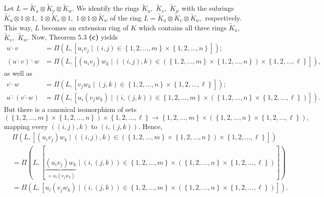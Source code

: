 \documentclass[numbers=enddot,12pt,final,onecolumn,notitlepage]{scrartcl}%
\begin{document}
Let $L=\widetilde{K}_{u}\otimes\widetilde{K}_{v}\otimes\widetilde{K}_{w}$. We
identify the rings $\widetilde{K}_{u},$ $\widetilde{K}_{v},$ $\widetilde{K}%
_{w}$ with the subrings $\widetilde{K}_{u}\otimes1\otimes1,$ $1\otimes
\widetilde{K}_{v}\otimes1,$ $1\otimes1\otimes\widetilde{K}_{w}$ of the ring
$L=\widetilde{K}_{u}\otimes\widetilde{K}_{v}\otimes\widetilde{K}_{w},$
respectively. This way, $L$ becomes an extension ring of $K$ which contains
all three rings $\widetilde{K}_{u},$ $\widetilde{K}_{v},$ $\widetilde{K}_{w}.$
Now, Theorem 5.3 \textbf{(c)} yields%
\begin{align*}
u\widehat{\cdot}v  &  =\Pi\left(  L,\left[  u_{i}v_{j}\mid\left(  i,j\right)
\in\left\{  1,2,...,m\right\}  \times\left\{  1,2,...,n\right\}  \right]
\right)  ;\\
\left(  u\widehat{\cdot}v\right)  \widehat{\cdot}w  &  =\Pi\left(  L,\left[
\left(  u_{i}v_{j}\right)  w_{k}\mid\left(  \left(  i,j\right)  ,k\right)
\in\left(  \left\{  1,2,...,m\right\}  \times\left\{  1,2,...,n\right\}
\right)  \times\left\{  1,2,...,\ell\right\}  \right]  \right)  ,
\end{align*}
as well as%
\begin{align*}
v\widehat{\cdot}w  &  =\Pi\left(  L,\left[  v_{j}w_{k}\mid\left(  j,k\right)
\in\left\{  1,2,...,n\right\}  \times\left\{  1,2,...,\ell\right\}  \right]
\right)  ;\\
u\widehat{\cdot}\left(  v\widehat{\cdot}w\right)   &  =\Pi\left(  L,\left[
u_{i}\left(  v_{j}w_{k}\right)  \mid\left(  i,\left(  j,k\right)  \right)
\in\left\{  1,2,...,m\right\}  \times\left(  \left\{  1,2,...,n\right\}
\times\left\{  1,2,...,\ell\right\}  \right)  \right]  \right)  .
\end{align*}
But there is a canonical isomorphism of sets%
\[
\left(  \left\{  1,2,...,m\right\}  \times\left\{  1,2,...,n\right\}  \right)
\times\left\{  1,2,...,\ell\right\}  \rightarrow\left\{  1,2,...,m\right\}
\times\left(  \left\{  1,2,...,n\right\}  \times\left\{  1,2,...,\ell\right\}
\right)  ,
\]
mapping every $\left(  \left(  i,j\right)  ,k\right)  $ to $\left(  i,\left(
j,k\right)  \right)  $. Hence,%
\begin{align*}
&  \Pi\left(  L,\left[  \left(  u_{i}v_{j}\right)  w_{k}\mid\left(  \left(
i,j\right)  ,k\right)  \in\left(  \left\{  1,2,...,m\right\}  \times\left\{
1,2,...,n\right\}  \right)  \times\left\{  1,2,...,\ell\right\}  \right]
\right) \\
&  =\Pi\left(  L,\left[  \underbrace{\left(  u_{i}v_{j}\right)  w_{k}}%
_{=u_{i}\left(  v_{j}w_{k}\right)  }\mid\left(  i,\left(  j,k\right)  \right)
\in\left\{  1,2,...,m\right\}  \times\left(  \left\{  1,2,...,n\right\}
\times\left\{  1,2,...,\ell\right\}  \right)  \right]  \right) \\
&  =\Pi\left(  L,\left[  u_{i}\left(  v_{j}w_{k}\right)  \mid\left(  i,\left(
j,k\right)  \right)  \in\left\{  1,2,...,m\right\}  \times\left(  \left\{
1,2,...,n\right\}  \times\left\{  1,2,...,\ell\right\}  \right)  \right]
\right)  .
\end{align*}
\end{document}
